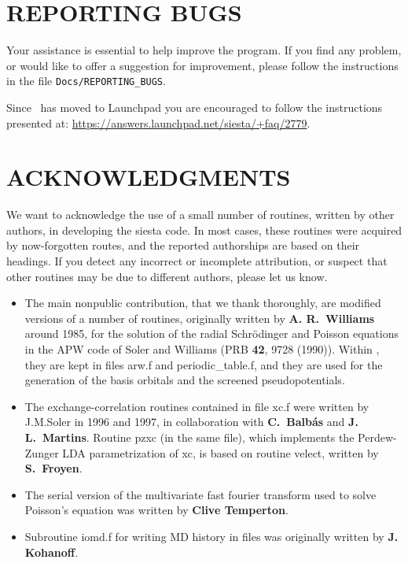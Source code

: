 \section{REPORTING BUGS}

Your assistance is essential to help improve the program. If you find
any problem, or would like to offer a suggestion for improvement,
please follow the instructions in the file
\texttt{Docs/REPORTING\_BUGS}. 

Since \siesta\ has moved to Launchpad you are encouraged to follow the
instructions presented at:
\url{https://answers.launchpad.net/siesta/+faq/2779}.



\section{ACKNOWLEDGMENTS}

We want to acknowledge the use of a small number of routines,
written by other authors, in developing the siesta code.
In most cases, these routines were acquired by now-forgotten
routes, and the reported authorships are based on their headings.
If you detect any incorrect or incomplete attribution, or suspect
that other routines may be due to different authors, please
let us know.

\begin{itemize}
  \item%
  The main nonpublic contribution, that we thank thoroughly, are
  modified versions of a number of routines, originally written by
  \textbf{A. R.\ Williams} around 1985, for the solution of the radial
  Schr\"odinger and Poisson equations in the APW code of Soler and
  Williams (PRB \textbf{42}, 9728 (1990)).  Within \siesta, they are
  kept in files arw.f and periodic\_table.f, and they are used for the
  generation of the basis orbitals and the screened pseudopotentials.

  \item%
  The exchange-correlation routines contained in file xc.f were
  written by J.M.Soler in 1996 and 1997, in collaboration with
  \textbf{C.\ Balb\'as} and \textbf{J. L.\ Martins}.  Routine pzxc (in
  the same file), which implements the Perdew-Zunger LDA
  parametrization of xc, is based on routine velect, written by
  \textbf{S.\ Froyen}.

  \item%
  The serial version of the multivariate fast fourier transform used
  to solve Poisson's equation was written by \textbf{Clive Temperton}.

  \item%
  Subroutine iomd.f for writing MD history in files was originally
  written by \textbf{J. Kohanoff}.

\end{itemize}

